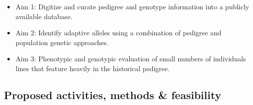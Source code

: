 \documentclass[12pt]{article}
\begin{document}



\begin{itemize}
\item Aim 1: Digitize and curate pedigree and genotype information into a publicly available database. 
\item Aim 2: Identify adaptive alleles using a combination of pedigree and population genetic approaches.
\item Aim 3: Phenotypic and genotypic evaluation of small numbers of individuals lines that feature heavily in the historical pedigree.

\end{itemize}
\subsection*{Proposed activities, methods \& feasibility}
\end{document}
